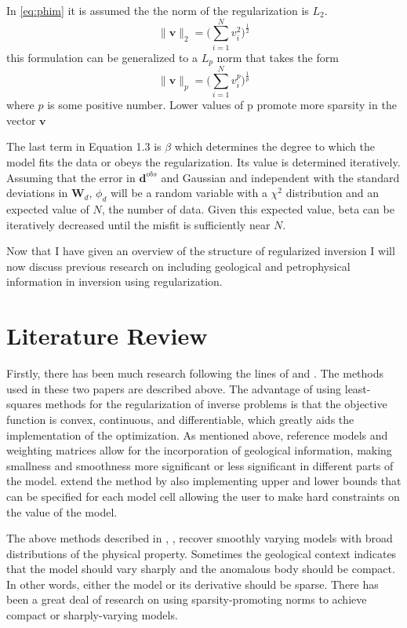 In \autoref{eq:phim} it is assumed the the norm of the regularization is $L_2$. 
\begin{equation}
\|\mathbf v\|_2 = \Big(\sum_{i=1}^N v_i^2\Big)^{\frac{1}{2}}
\end{equation}
this formulation can be generalized to a $L_p$ norm that takes the form
\begin{equation}
\|\mathbf v\|_p = \Big(\sum_{i=1}^N v_i^p\Big)^{\frac{1}{p}}
\end{equation}
where $p$ is some positive number. Lower values of p promote more sparsity in the vector $\mathbf v$

The last term in Equation 1.3 is $\beta$ which determines the degree to which the model fits the data or obeys the regularization. Its value is determined iteratively. Assuming that the error in $\mathbf d^{obs}$ and Gaussian  and  independent with the standard deviations in $\mathbf W_d$, $\phi_d$ will be a random variable with a $\chi^2$ distribution and an expected value of $N$, the number of data. Given this expected value, beta can be iteratively decreased until the misfit is sufficiently near $N$.

Now that I have given an overview of the structure of regularized inversion I will now discuss previous research on including geological and petrophysical information in inversion using regularization.

\section{Literature Review}
\label{sec:Literature Review}

Firstly, there has been much research following the lines of \cite{li19963} and \cite{li19983}. The methods used in these two papers are described above. The advantage of using least-squares methods for the regularization of inverse problems is that the objective function is convex, continuous, and differentiable, which greatly aids the implementation of the optimization. As mentioned above, reference models and weighting matrices allow for the incorporation of geological information, making smallness and smoothness more significant or less significant in different parts of the model. \cite{li2003fast} extend the method by also implementing upper and lower bounds that can be specified for each model cell allowing the user to make hard constraints on the value of the model.

The above methods described in \cite{li19963},   \cite{li19983}, \cite{li2003fast} recover smoothly varying models with broad distributions of the physical property. Sometimes the geological context indicates that the model should vary sharply and the anomalous body should be compact. In other words, either the model or its derivative should be sparse. There has been a great deal of research on using sparsity-promoting norms to achieve compact or sharply-varying models.

